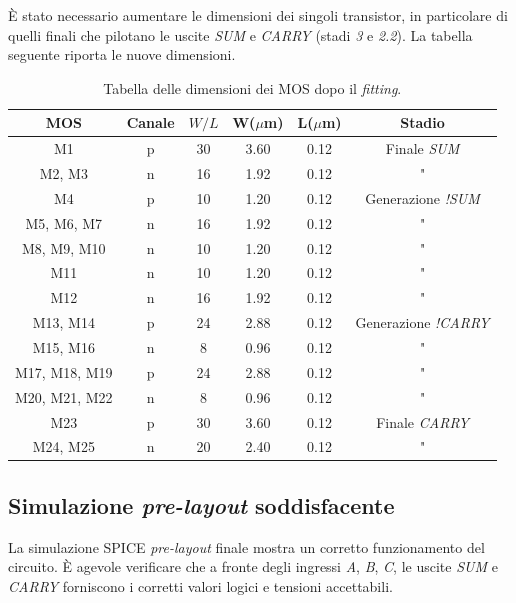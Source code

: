\MakeUppercase{è} stato necessario aumentare le dimensioni dei singoli transistor, in particolare di quelli finali che pilotano le uscite \textit{SUM} e \textit{CARRY} (stadi \textit{3} e \textit{2.2}). La tabella seguente riporta le nuove dimensioni.

\begin{table}[htb]
	\centering
	\begin{tabular}{c*{5}{c}}
		\toprule
		MOS & Canale & $W/L$ & W($\mu$m) & L($\mu$m) & Stadio\\
		\midrule
		M1 & p & 30 & 3.60 & 0.12 & Finale \textit{SUM} \\
		M2, M3 & n & 16 & 1.92 & 0.12 & " \\
		M4 & p & 10 & 1.20 & 0.12 & Generazione \textit{!SUM} \\
		M5, M6, M7 & n & 16 & 1.92 & 0.12 & " \\
		M8, M9, M10 & n & 10 & 1.20 & 0.12 & " \\
		M11 & n & 10 & 1.20 & 0.12 & " \\
		M12 & n & 16 & 1.92 & 0.12 & " \\
		M13, M14 & p & 24 & 2.88 & 0.12 & Generazione \textit{!CARRY} \\
		M15, M16 & n & 8 & 0.96 & 0.12 & " \\
		M17, M18, M19 & p & 24 & 2.88 & 0.12 & " \\
		M20, M21, M22 & n & 8 & 0.96 & 0.12 & " \\
		M23 & p & 30 & 3.60 & 0.12 & Finale \textit{CARRY} \\
		M24, M25 & n & 20 & 2.40 & 0.12 & " \\
		\bottomrule
	\end{tabular}
	\caption{Tabella delle dimensioni dei MOS dopo il \textit{fitting}.}
	\label{tab:dimensioniMosDefinitive}
\end{table}

\subsection{Simulazione \textit{pre-layout} soddisfacente}
La simulazione SPICE \textit{pre-layout} finale mostra un corretto funzionamento del circuito. \MakeUppercase{è} agevole verificare che a fronte degli ingressi \textit{A}, \textit{B}, \textit{C}, le uscite \textit{SUM} e \textit{CARRY} forniscono i corretti valori logici e tensioni accettabili.

